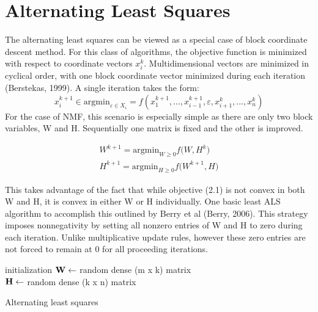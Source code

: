 \documentclass[final,leqno,onefignum,onetabnum]{siamltex1213}
\begin{document}
\section{Alternating Least Squares} The alternating least squares can be viewed as a special case of block coordinate descent method. For this class of algorithms, the objective function is minimized with respect to coordinate vectors $x^{k}_{i}$. Multidimensional vectors are minimized in cyclical order, with one block coordinate vector minimized during each iteration (Berstekas, 1999). A single iteration takes the form:
\begin{equation}\label{bcv1}
 x^{k+1}_{i} \in {\mathrm{argmin}_{\varepsilon \in X_i}} = f( x^{k+1}_{1}, ..., x^{k+1}_{i-1}, \varepsilon, x^{k}_{i+1}, ..., x^{k}_{n})
\end{equation}
For the case of NMF, this scenario is especially simple as there are only two block variables, W and H. Sequentially one matrix is fixed and the other is improved. 

\begin{equation}\label{bcv2}
\begin{align} 
W^{k+1} = {\mathrm{argmin}_{W \ge 0} f(W,H^k}) \\
H^{k+1} = {\mathrm{argmin}_{H \ge 0} f(W^{k+1},H})
\end{align}
\end{equation}




This takes advantage of the fact that while objective (2.1) is not convex in both W and H, it is convex in either W or H individually. One basic least ALS algorithm to accomplish this outlined by Berry et al (Berry, 2006). This strategy imposes nonnegativity by setting all nonzero entries of W and H to zero during each iteration. Unlike multiplicative update rules, however these zero entries are not forced to remain at 0 for all proceeding iterations. \\

\begin{algorithm}[H]	

 initialization\;
$\bf{W} \gets $ random dense (m x k) matrix\\
$\bf{H} \gets $ random dense (k x n) matrix\\
 \caption{Alternating least squares}
\end{algorithm} 
\end{document}

